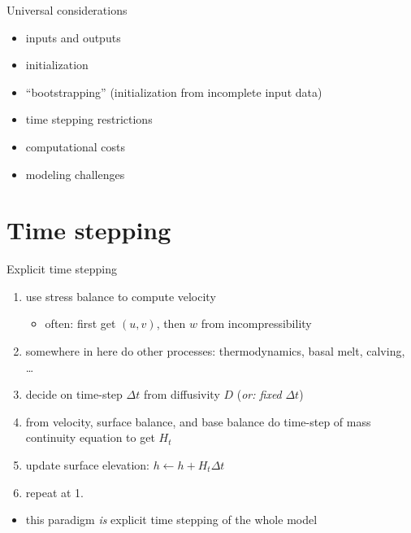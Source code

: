 \documentclass[hide notes,intlimits]{beamer}
\begin{document}

\begin{frame}{Universal considerations}
  \begin{itemize}
  \item inputs and outputs
  \item initialization
  \item ``bootstrapping'' (initialization from incomplete input data)
  \item time stepping restrictions
  \item computational costs
  \item modeling challenges
  \end{itemize}
\end{frame}

\section{Time stepping}
\label{sec:time-stepping}

\begin{frame}{Explicit time stepping}

  \begin{enumerate}
  \item use stress balance to compute velocity
    \begin{itemize}
    \item often: first get $(u,v)$, then $w$ from incompressibility
    \end{itemize}
  \item somewhere in here do other processes: thermodynamics, basal melt, calving, \dots
  \item decide on time-step $\Delta t$ from diffusivity $D$ \hfill (\emph{or: fixed} $\Delta t$)
  \item from velocity, surface balance, and base balance do time-step of mass continuity equation to get $H_t$
  \item update surface elevation: $h \gets h+H_t \Delta t$
  \item repeat at 1.
  \end{enumerate}

  \bigskip
  \begin{itemize}
  \item this paradigm \emph{is} explicit time stepping of the whole model
  \end{itemize}
\end{frame}
\end{document}
